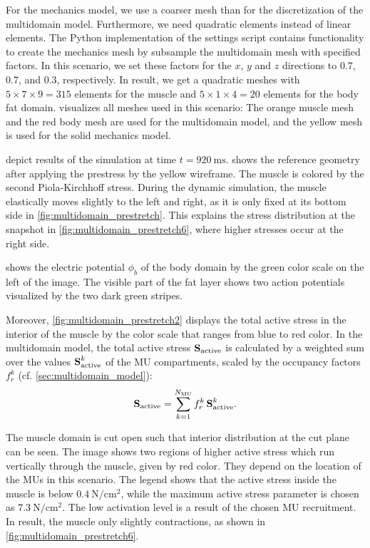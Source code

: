 For the mechanics model, we use a coarser mesh than for the discretization of the multidomain model. Furthermore, we need quadratic elements instead of linear elements. The Python implementation of the settings script contains functionality to create the mechanics mesh by subsample the multidomain mesh with specified factors. In this scenario, we set these factors for the $x$, $y$ and $z$ directions to 0.7, 0.7, and 0.3, respectively. In result, we get a quadratic meshes with $5 \times 7 \times 9 = 315$ elements for the muscle and $5 \times 1 \times 4 = 20$  elements for the body fat domain.  visualizes all meshes used in this scenario: The orange muscle mesh and the red body mesh are used for the multidomain model, and the yellow mesh is used for the solid mechanics model.

 depict results of the simulation at time $t=\SI{920}{\milli\second}$. 
 shows the reference geometry after applying the prestress by the yellow wireframe. The muscle is colored by the second Piola-Kirchhoff stress. During the dynamic simulation, the muscle elastically moves slightly to the left and right, as it is only fixed at its bottom side in \cref{fig:multidomain_prestretch}. This explains the stress distribution at the snapshot in \cref{fig:multidomain_prestretch6}, where higher stresses occur at the right side.

 shows the electric potential $\phi_b$ of the body domain by the green color scale on the left of the image. The visible part of the fat layer shows two action potentials visualized by the two dark green stripes.

Moreover, \cref{fig:multidomain_prestretch2} displays the total active stress in the interior of the muscle by the color scale that ranges from blue to red color. In the multidomain model, the total active stress $\textbf{S}_\text{active}$ is calculated by a weighted sum over the values $\textbf{S}_\text{active}^k$ of the MU compartments, scaled by the occupancy factors $f_r^k$ (cf. \cref{sec:multidomain_model}):
\begin{align*}
  \textbf{S}_\text{active} = \sum\limits_{k=1}^{N_\text{MU}} f_r^k\,\textbf{S}_\text{active}^k.
\end{align*}


The muscle domain is cut open such that interior distribution at the cut plane can be seen. The image shows two regions of higher active stress which run vertically through the muscle, given by red color. They depend on the location of the MUs in this scenario. The legend shows that the active stress inside the muscle is below $\SI{0.4}{\newton\per\centi\meter\squared}$, while the maximum active stress parameter is chosen as $\SI{7.3}{\newton\per\centi\meter\squared}$. The low activation level is a result of the chosen MU recruitment. In result, the muscle only slightly contractions, as shown in \cref{fig:multidomain_prestretch6}.

